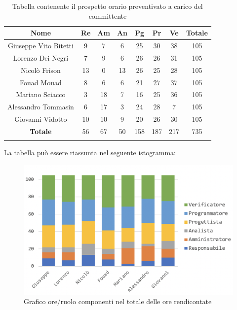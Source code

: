 				\begin{longtable}{|c|c|c|c|c|c|c|c|}
					\hline
					\rowcolor{lighter-grayer}
					\textbf{Nome} & \textbf{Re} & \textbf{Am} & \textbf{An} & \textbf{Pg}  & \textbf{Pr}   & \textbf{Ve} & \textbf{Totale} \\
					\hline
					\endfirsthead
					
					\hline
					Giuseppe Vito Bitetti 		& 9 & 7 & 6 & 25 & 30 & 38 & 105\\
					\hline
					\hline
					Lorenzo Dei Negri			& 7 & 9 & 6 & 26 & 26 & 31 & 105\\
					\hline
					\hline
					Nicolò Frison				    & 13 & 0 & 13 &26 & 25 & 28 & 105\\
					\hline
					\hline
					Fouad Mouad 				 & 8 & 6 & 6 & 21 & 27 & 37 & 105\\
					\hline
					\hline
					Mariano Sciacco 			& 3 & 18 & 7 & 16 & 25 & 36 & 105\\
					\hline
					\hline
					Alessandro Tommasin    & 6 & 17 & 3 & 24 & 28 & 7 & 105\\
					\hline
					\hline
					Giovanni Vidotto 			 & 10 & 10 & 9 & 20 & 26 & 30 & 105\\
					\hline 
					\textbf{Totale}				 & 56 &  67 & 50 & 158 & 187 & 217 & 735\\
					\hline
					\caption{Tabella contenente il prospetto orario preventivato a carico del committente}
				\end{longtable}
				\pagebreak
				
				La tabella può essere riassunta nel seguente istogramma:
				\begin{figure}[H]
					\centering
					\includegraphics[width=0.8\linewidth]{./images/totOreRed1.png}
					\caption{Grafico ore/ruolo componenti nel totale delle ore rendicontate}
					\label{fig:grafico suddivione ruoli totale ore rendicontete}
				\end{figure}
			
